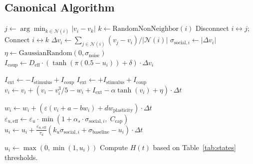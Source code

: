 \documentclass[11pt]{article}
\begin{document}
\subsection{Canonical Algorithm}

\begin{algorithm}
\caption{Mem4ristor v3.2.0 Time-Step Update}
\begin{algorithmic}[1]
    \STATE {}
        \STATE $j \leftarrow \arg\min_{k \in \mathcal{N}(i)} |v_i - v_k|$ 
        \STATE $k \leftarrow \text{RandomNonNeighbor}(i)$
        \STATE Disconnect $i \leftrightarrow j$; Connect $i \leftrightarrow k$ 
    \ENDFOR
    \STATE {}
        \STATE $\Delta v_i \leftarrow \sum_{j \in \mathcal{N}(i)} (v_j - v_i) / |\mathcal{N}(i)|$
        \STATE $\sigma_{\text{social}, i} \leftarrow |\Delta v_i|$
    \ENDFOR
    \STATE {}
        \STATE $\eta \leftarrow \text{GaussianRandom}(0, \sigma_{\text{noise}})$
        \STATE $I_{\text{coup}} \leftarrow D_{\text{eff}} \cdot (\tanh(\pi(0.5 - u_i)) + \delta) \cdot \Delta v_i$

            \STATE $I_{\text{ext}} \leftarrow -I_{\text{stimulus}} + I_{\text{coup}}$
        \ELSE
            \STATE $I_{\text{ext}} \leftarrow +I_{\text{stimulus}} + I_{\text{coup}}$
        \ENDIF
        \STATE {}
        \STATE $v_i \leftarrow v_i + (v_i - v_i^3/5 - w_i + I_{\text{ext}} - \alpha \tanh(v_i) + \eta) \cdot \Delta t$

        \STATE $w_i \leftarrow w_i + (\varepsilon(v_i + a - b w_i) + dw_{\text{plasticity}}) \cdot \Delta t$
        \STATE {}
        \STATE $\varepsilon_{u,\text{eff}} \leftarrow \varepsilon_u \cdot \min(1 + \alpha_s \cdot \sigma_{\text{social},i},\; C_{\text{cap}})$
        \STATE $u_i \leftarrow u_i + \frac{\varepsilon_{u,\text{eff}}}{\tau_u}(k_u \sigma_{\text{social},i} + \sigma_{\text{baseline}} - u_i) \cdot \Delta t$

        \STATE $u_i \leftarrow \max(0, \min(1, u_i))$ 
    \ENDFOR
    \STATE {}
    \STATE Compute $H(t)$ based on Table~\ref{tab:states} thresholds.
\ENDFOR
\end{algorithmic}
\end{algorithm}
\end{document}
